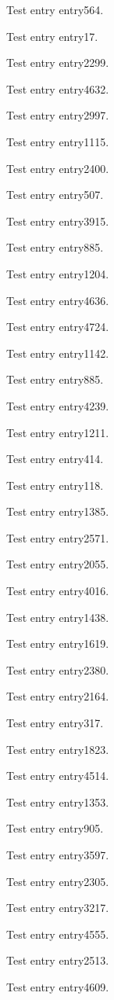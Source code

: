 Test entry \gls{entry564}.

Test entry \gls{entry17}.

Test entry \gls{entry2299}.

Test entry \gls{entry4632}.

Test entry \gls{entry2997}.

Test entry \gls{entry1115}.

Test entry \gls{entry2400}.

Test entry \gls{entry507}.

Test entry \gls{entry3915}.

Test entry \gls{entry885}.

Test entry \gls{entry1204}.

Test entry \gls{entry4636}.

Test entry \gls{entry4724}.

Test entry \gls{entry1142}.

Test entry \gls{entry885}.

Test entry \gls{entry4239}.

Test entry \gls{entry1211}.

Test entry \gls{entry414}.

Test entry \gls{entry118}.

Test entry \gls{entry1385}.

Test entry \gls{entry2571}.

Test entry \gls{entry2055}.

Test entry \gls{entry4016}.

Test entry \gls{entry1438}.

Test entry \gls{entry1619}.

Test entry \gls{entry2380}.

Test entry \gls{entry2164}.

Test entry \gls{entry317}.

Test entry \gls{entry1823}.

Test entry \gls{entry4514}.

Test entry \gls{entry1353}.

Test entry \gls{entry905}.

Test entry \gls{entry3597}.

Test entry \gls{entry2305}.

Test entry \gls{entry3217}.

Test entry \gls{entry4555}.

Test entry \gls{entry2513}.

Test entry \gls{entry4609}.

